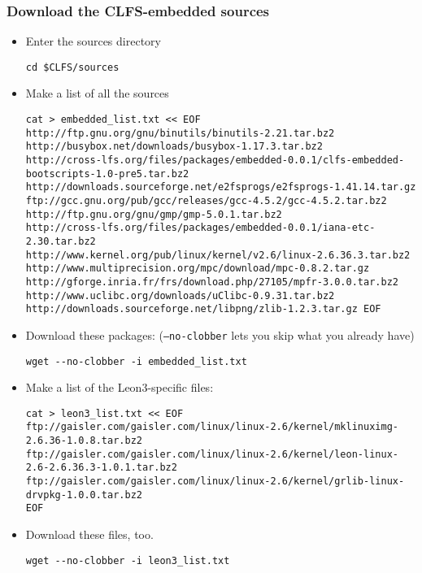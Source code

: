 \subsubsection{Download the CLFS-embedded sources}
 \begin{itemize}
  \item Enter the sources directory
  \begin{lstlisting}
cd $CLFS/sources
  \end{lstlisting}
  \item Make a list of all the sources
  \begin{lstlisting}
cat > embedded_list.txt << EOF
http://ftp.gnu.org/gnu/binutils/binutils-2.21.tar.bz2
http://busybox.net/downloads/busybox-1.17.3.tar.bz2
http://cross-lfs.org/files/packages/embedded-0.0.1/clfs-embedded-bootscripts-1.0-pre5.tar.bz2
http://downloads.sourceforge.net/e2fsprogs/e2fsprogs-1.41.14.tar.gz
ftp://gcc.gnu.org/pub/gcc/releases/gcc-4.5.2/gcc-4.5.2.tar.bz2
http://ftp.gnu.org/gnu/gmp/gmp-5.0.1.tar.bz2
http://cross-lfs.org/files/packages/embedded-0.0.1/iana-etc-2.30.tar.bz2
http://www.kernel.org/pub/linux/kernel/v2.6/linux-2.6.36.3.tar.bz2
http://www.multiprecision.org/mpc/download/mpc-0.8.2.tar.gz
http://gforge.inria.fr/frs/download.php/27105/mpfr-3.0.0.tar.bz2
http://www.uclibc.org/downloads/uClibc-0.9.31.tar.bz2
http://downloads.sourceforge.net/libpng/zlib-1.2.3.tar.gz EOF
  \end{lstlisting}
  \item Download these packages: (\texttt{--no-clobber} lets you skip what you already have)
  \begin{lstlisting}
wget --no-clobber -i embedded_list.txt
  \end{lstlisting}

  \item Make a list of the Leon3-specific files:
  \begin{lstlisting}
cat > leon3_list.txt << EOF
ftp://gaisler.com/gaisler.com/linux/linux-2.6/kernel/mklinuximg-2.6.36-1.0.8.tar.bz2
ftp://gaisler.com/gaisler.com/linux/linux-2.6/kernel/leon-linux-2.6-2.6.36.3-1.0.1.tar.bz2
ftp://gaisler.com/gaisler.com/linux/linux-2.6/kernel/grlib-linux-drvpkg-1.0.0.tar.bz2
EOF
  \end{lstlisting}

  \item Download these files, too.
  \begin{lstlisting}
wget --no-clobber -i leon3_list.txt
  \end{lstlisting}


\end{itemize}
